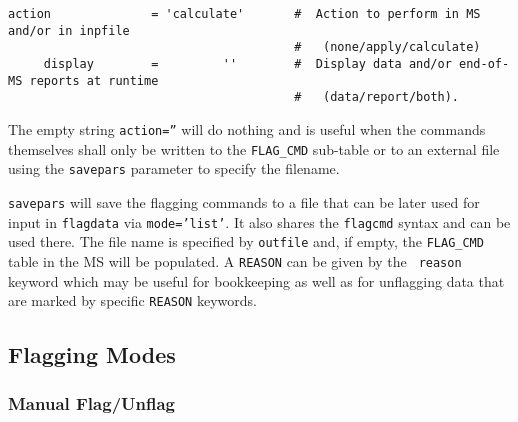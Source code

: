 \small
\begin{verbatim}
action              = 'calculate'       #  Action to perform in MS and/or in inpfile
                                        #   (none/apply/calculate)
     display        =         ''        #  Display data and/or end-of-MS reports at runtime
                                        #   (data/report/both).
\end{verbatim}
\normalsize

The empty string {\tt action=''} will do nothing and is useful when the
commands themselves shall only be written to the {\tt FLAG\_CMD}
sub-table or to an external file using the {\tt savepars} parameter to
specify the filename.

{\tt savepars} will save the flagging commands to a file that can be
later used for input in {\tt flagdata} via {\tt mode='list'}. It also
shares the {\tt flagcmd} syntax and can be used there. The file name
is specified by {\tt outfile} and, if empty, the {\tt FLAG\_CMD} table
in the MS will be populated.  A {\tt REASON} can be given by the {\tt
  reason} keyword which may be useful for bookkeeping as well as for
unflagging data that are marked by specific {\tt REASON}
keywords.




\subsection{Flagging Modes}
\label{section:edit.flagdata.mode}

\subsubsection{Manual Flag/Unflag}
\label{section:edit.flagdata.mode.manual}

